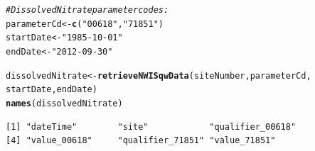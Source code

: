\documentclass[a4paper,11pt]{article}\usepackage[]{graphicx}\usepackage[]{color}
\makeatletter
\newcommand{\hlstr}[1]{\textcolor[rgb]{0.192,0.494,0.8}{#1}}%
\newcommand{\hlcom}[1]{\textcolor[rgb]{0.678,0.584,0.686}{\textit{#1}}}%
\newcommand{\hlstd}[1]{\textcolor[rgb]{0.345,0.345,0.345}{#1}}%
\newcommand{\hlkwb}[1]{\textcolor[rgb]{0.69,0.353,0.396}{#1}}%
\newcommand{\hlkwd}[1]{\textcolor[rgb]{0.737,0.353,0.396}{\textbf{#1}}}%
\newenvironment{kframe}{%
 \def\at@end@of@kframe{}%
 \ifinner\ifhmode%
  \def\at@end@of@kframe{\end{minipage}}%
  \begin{minipage}{\columnwidth}%
 \fi\fi%
 \def\FrameCommand##1{\hskip\@totalleftmargin \hskip-\fboxsep
 \colorbox{shadecolor}{##1}\hskip-\fboxsep
     \hskip-\linewidth \hskip-\@totalleftmargin \hskip\columnwidth}%
 \MakeFramed {\advance\hsize-\width
   \@totalleftmargin\z@ \linewidth\hsize
   \@setminipage}}%
 {\par\unskip\endMakeFramed%
 \at@end@of@kframe}
\newenvironment{knitrout}{}{} %
\makeatother
\begin{document}
\begin{knitrout}
\color{fgcolor}\begin{kframe}
\begin{alltt}
\hlcom{# Dissolved Nitrate parameter codes:}
\hlstd{parameterCd} \hlkwb{<-} \hlkwd{c}\hlstd{(}\hlstr{"00618"}\hlstd{,}\hlstr{"71851"}\hlstd{)}
\hlstd{startDate} \hlkwb{<-} \hlstr{"1985-10-01"}
\hlstd{endDate} \hlkwb{<-} \hlstr{"2012-09-30"}

\hlstd{dissolvedNitrate} \hlkwb{<-} \hlkwd{retrieveNWISqwData}\hlstd{(siteNumber, parameterCd,}
      \hlstd{startDate, endDate)}
\hlkwd{names}\hlstd{(dissolvedNitrate)}
\end{alltt}
\begin{verbatim}
[1] "dateTime"        "site"            "qualifier_00618"
[4] "value_00618"     "qualifier_71851" "value_71851"    
\end{verbatim}
\end{kframe}
\end{knitrout}

\end{document}
